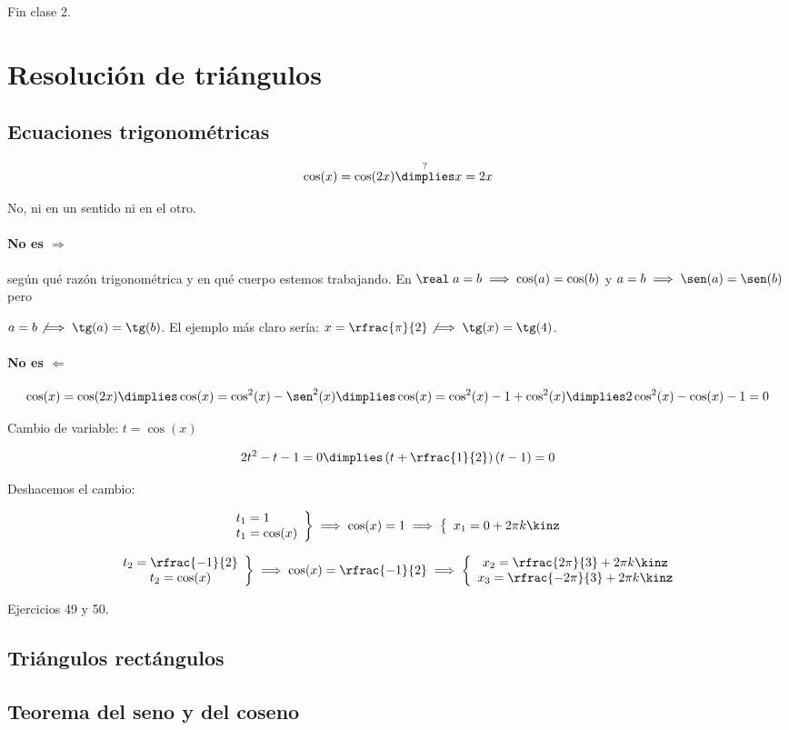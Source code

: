 Fin clase 2.

\section{Resolución de triángulos}

\subsection{Ecuaciones trigonométricas}

\[\cos(x) = \cos(2x) \overset{?}{\dimplies} x=2x\]

No, ni en un sentido ni en el otro. 

\paragraph{No es $\Rightarrow$} según qué razón trigonométrica y en qué cuerpo estemos trabajando. En $\real\; a = b \implies \cos(a)=\cos(b)$ y $a = b \implies \sen(a)=\sen(b)$ pero 

$a = b \not\implies \tg(a)=\tg(b)$. El ejemplo más claro sería: $x = \rfrac{\pi}{2} \not\implies \tg(x) = \tg(4)$.

\paragraph{No es $\Leftarrow$}


\[
\cos(x) = \cos(2x) \dimplies \cos(x) = \cos^2(x) - \sen^2(x) \dimplies \cos(x) = \cos^2(x) - 1 + \cos^2(x) \dimplies 2\cos^2(x) - \cos(x) -1 = 0
\]

Cambio de variable: $t = \cos(x)$

\[
	2t^2-t-1 = 0 \dimplies \left(t+\rfrac{1}{2}\right)(t-1)=0
\]

Deshacemos el cambio:


\[
\left.
\begin{array}{l}
t_1 = 1\\
t_1 = \cos(x)
\end{array}
\right\} \implies \cos(x) = 1\implies \left\{\begin{array}{l}
x_1 = 0 + 2\pi k\kinz
\end{array}\right.
\]

\[
\left.
\begin{array}{c}
t_2 = \rfrac{-1}{2}\\
t_2 = \cos(x)
\end{array}
\right\} \implies \cos(x) = \rfrac{-1}{2} \implies \left\{\begin{array}{c}
x_2 = \rfrac{2\pi}{3} + 2\pi k\kinz\\
x_3 = \rfrac{-2\pi}{3} + 2\pi k\kinz
\end{array}\right.
\]

Ejercicios 49 y 50.


\subsection{Triángulos rectángulos}

\subsection{Teorema del seno y del coseno}
